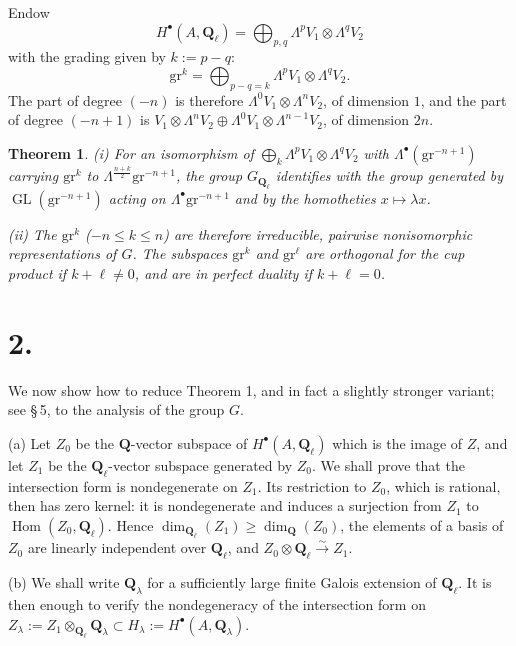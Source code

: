 \documentclass[11pt,a4paper]{article}
\theoremstyle{plain}
\newtheorem{theorem}{Theorem}
\theoremstyle{definition}
\DeclareMathOperator{\Hom}{Hom}
\DeclareMathOperator{\GL}{GL}
\begin{document}
Endow
\[
H^\bullet(A, \mathbf{Q}_\ell) = \bigoplus_{p,q} \Lambda^p V_1 \otimes \Lambda^q V_2
\]
with the grading given by $k := p - q$:
\begin{equation}\label{eq:grad}
\mathrm{gr}^k = \bigoplus_{p-q=k} \Lambda^p V_1 \otimes \Lambda^q V_2 .
\end{equation}
The part of degree $(-n)$ is therefore $\Lambda^0 V_1 \otimes \Lambda^n V_2$, of dimension $1$, and the part of degree $(-n+1)$ is $V_1 \otimes \Lambda^n V_2 \oplus \Lambda^0 V_1 \otimes \Lambda^{n-1} V_2$, of dimension $2n$.

\begin{theorem}\label{thm:3}
\emph{(i)} For an isomorphism of $\bigoplus_k \Lambda^p V_1 \otimes \Lambda^q V_2$ with $\Lambda^\bullet(\mathrm{gr}^{-n+1})$ carrying $\mathrm{gr}^k$ to $\Lambda^{\frac{n+k}{2}} \mathrm{gr}^{-n+1}$, the group $G_{\mathbf{Q}_\ell}$ identifies with the group generated by $\GL(\mathrm{gr}^{-n+1})$ acting on $\Lambda^\bullet \mathrm{gr}^{-n+1}$ and by the homotheties $x \mapsto \lambda x$.

\emph{(ii)} The $\mathrm{gr}^k$ ($-n \leq k \leq n$) are therefore irreducible, pairwise nonisomorphic representations of $G$. The subspaces $\mathrm{gr}^k$ and $\mathrm{gr}^\ell$ are orthogonal for the cup product if $k + \ell \neq 0$, and are in perfect duality if $k + \ell = 0$.
\end{theorem}

\section*{2.}

We now show how to reduce Theorem 1, and in fact a slightly stronger variant; see \S\,5, to the analysis of the group $G$.

(a) Let $Z_0$ be the $\mathbf{Q}$-vector subspace of $H^\bullet(A, \mathbf{Q}_\ell)$ which is the image of $Z$, and let $Z_1$ be the $\mathbf{Q}_\ell$-vector subspace generated by $Z_0$. We shall prove that the intersection form is nondegenerate on $Z_1$. Its restriction to $Z_0$, which is rational, then has zero kernel: it is nondegenerate and induces a surjection from $Z_1$ to $\Hom(Z_0, \mathbf{Q}_\ell)$. Hence $\dim_{\mathbf{Q}_\ell}(Z_1) \geq \dim_{\mathbf{Q}}(Z_0)$, the elements of a basis of $Z_0$ are linearly independent over $\mathbf{Q}_\ell$, and $Z_0 \otimes \mathbf{Q}_\ell \xrightarrow{\sim} Z_1$.

(b) We shall write $\mathbf{Q}_\lambda$ for a sufficiently large finite Galois extension of $\mathbf{Q}_\ell$. It is then enough to verify the nondegeneracy of the intersection form on $Z_\lambda := Z_1 \otimes_{\mathbf{Q}_\ell} \mathbf{Q}_\lambda \subset H_\lambda := H^\bullet(A, \mathbf{Q}_\lambda)$.
\end{document}
